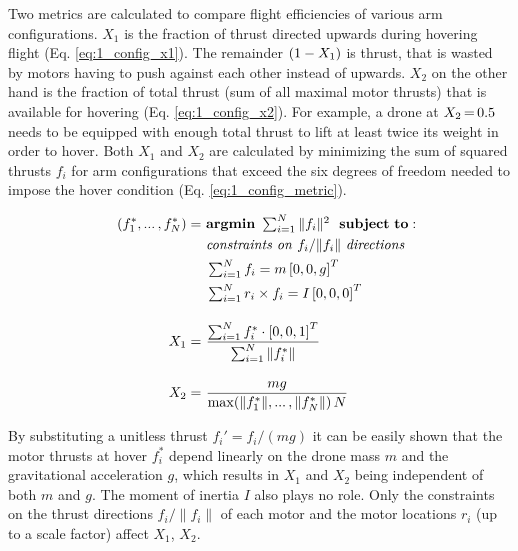 \documentclass[conference]{IEEEtran}
\newcommand{\mcomp}{\thinmuskip=3mu\medmuskip=3mu\thickmuskip=3mu}
\begin{document}
\par
Two metrics are calculated to compare flight efficiencies of various arm configurations. $X_1$ is the fraction of thrust directed upwards during hovering flight (Eq. \ref{eq:1_config_x1}). The remainder ${\mcomp (1-X_1)}$ is thrust, that is wasted by motors having to push against each other instead of upwards. $X_2$ on the other hand is the fraction of total thrust (sum of all maximal motor thrusts) that is available for hovering (Eq. \ref{eq:1_config_x2}). For example, a drone at $\mcomp X_2=0.5$ needs to be equipped with enough total thrust to lift at least twice its weight in order to hover. Both $X_1$ and $X_2$ are calculated by minimizing the sum of squared thrusts $f_i$ for arm configurations that exceed the six degrees of freedom needed to impose the hover condition (Eq. \ref{eq:1_config_metric}).
\par
\vspace{-10pt}
\begin{align}
	\phantom{\left(f_1^*,...\,,f_N^*\right) =}
	&\begin{aligned}
		\mathllap{\left(f_1^*,...\,,f_N^*\right)} =& \ \mathrm{\mathbf{argmin}} \ \textstyle\sum_{i=1}^{N} \|f_i\|^2 \ \ \mathrm{\mathbf{subject\ to:}}  \\
		&\ \textrm{\textit{constraints on}} \ f_i/\|f_i\| \ \textrm{\textit{directions}} \\
		&\ \textstyle\sum_{i=1}^{N} f_i = m \left[0,0,g\right]^T \\
		&\ \textstyle\sum_{i=1}^{N} r_i \times f_i = I \left[0,0,0\right]^T
		\label{eq:1_config_metric}
	\end{aligned}\\[10pt]
	&\begin{aligned}
		\mathllap{X_1} =&\ \frac{ \textstyle\sum_{i=1}^{N} f_i^* \cdot \left[0,0,1\right]^T }{ \textstyle\sum_{i=1}^{N} \|f_i^*\| } 
		\label{eq:1_config_x1}
	\end{aligned}\\[10pt]
	&\begin{aligned}
		\mathllap{X_2} =&\ \frac{ mg }{ \mathrm{max}\!\left(\|f_1^*\|,...\,,\|f_N^*\|\right) N } 
		\label{eq:1_config_x2}
	\end{aligned}
\end{align}
\par
By substituting a unitless thrust $f_i'=f_i/(mg)$ it can be easily shown that the motor thrusts at hover $f_i^*$ depend linearly on the drone mass $m$ and the gravitational acceleration $g$, which results in $X_1$ and $X_2$ being independent of both $m$ and $g$. The moment of inertia $I$ also plays no role. Only the constraints on the thrust directions $f_i/\|f_i\|$ of each motor and the motor locations $r_i$ (up to a scale factor) affect $X_1$, $X_2$.
\end{document}
